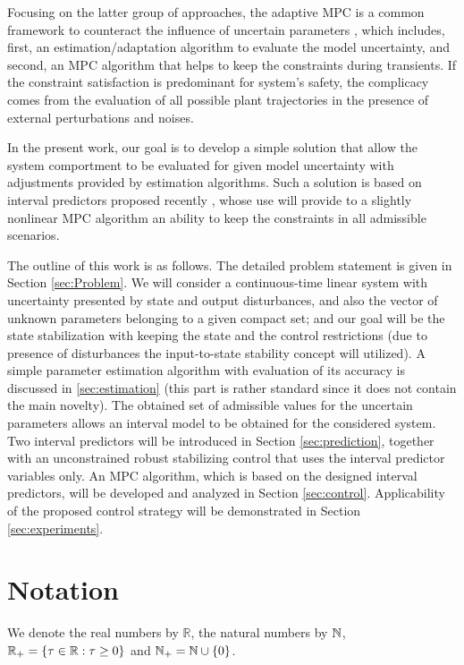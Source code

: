 \documentclass[letterpaper, 10 pt, conference]{ieeeconf}  %
\begin{document}
Focusing on the latter group of approaches, the adaptive MPC is a
common framework to counteract the influence of uncertain parameters
\cite{Fukushima2007,Adetola2009,Adetola2011,Aswani2013,Vicente2019},
which includes, first, an estimation/adaptation algorithm to evaluate
the model uncertainty, and second, an MPC algorithm that helps to
keep the constraints during transients. If the constraint satisfaction
is predominant for system's safety, the complicacy comes from the
evaluation of all possible plant trajectories in the presence of external
perturbations and noises. 

In the present work, our goal is to develop a simple solution that
allow the system comportment to be evaluated for given model uncertainty
with adjustments provided by estimation algorithms. Such a solution
is based on interval predictors proposed recently \cite{Efimov2012,leurent2019interval},
whose use will provide to a slightly nonlinear MPC algorithm an ability
to keep the constraints in all admissible scenarios.

The outline of this work is as follows. The detailed problem statement
is given in Section \ref{sec:Problem}. We will consider a continuous-time
linear system with uncertainty presented by state and output disturbances,
and also the vector of unknown parameters belonging to a given compact
set; and our goal will be the state stabilization with keeping the
state and the control restrictions (due to presence of disturbances
the input-to-state stability concept will utilized). A simple parameter
estimation algorithm with evaluation of its accuracy is discussed
in \ref{sec:estimation} (this part is rather standard since it does
not contain the main novelty). The obtained set of admissible values
for the uncertain parameters allows an interval model to be obtained
for the considered system. Two interval predictors will be introduced
in Section \ref{sec:prediction}, together with an unconstrained robust
stabilizing control that uses the interval predictor variables only.
An MPC algorithm, which is based on the designed interval predictors,
will be developed and analyzed in Section \ref{sec:control}. Applicability
of the proposed control strategy will be demonstrated in Section \ref{sec:experiments}.

\section*{Notation}

We denote the real numbers  by $\mathbb{R}$, the natural numbers
by $\mathbb{N}$, $\mathbb{R}_{+}=\{\tau\in\mathbb{R}:\tau\ge0\}$ and $\mathbb{N}_{+}=\mathbb{N}\cup\{0\}$. 
\end{document}
